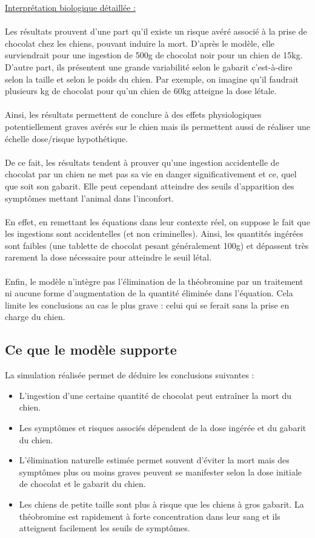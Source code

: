 \documentclass[11pt,a4paper]{article}
\begin{document}
\underline{Interprétation biologique détaillée :} 
\\
\\ Les résultats prouvent d'une part qu'il existe un risque avéré associé à la prise de 
chocolat chez les chiens, pouvant induire la mort. D'après le modèle, elle surviendrait 
pour une ingestion de 500g de chocolat noir pour un chien de 15kg. D'autre part, ils présentent une 
grande variabilité selon le gabarit c'est-à-dire selon la taille et selon le poids du chien. 
Par exemple, on imagine qu'il faudrait plusieurs kg de chocolat pour qu'un chien de 60kg atteigne la dose létale. \\
\\
Ainsi, les résultats permettent de conclure à des effets physiologiques
potentiellement graves avérés sur le chien mais ils permettent aussi de réaliser une 
échelle dose/risque hypothétique. \\
\\
De ce fait, les résultats tendent à prouver qu'une 
ingestion accidentelle de chocolat par un chien ne met pas sa vie en danger 
significativement et ce, quel que soit son gabarit. Elle peut cependant atteindre des seuils 
d'apparition des symptômes mettant l'animal dans l'inconfort. \\
\\
En effet, en remettant les 
équations dans leur contexte réel, on suppose le fait que les ingestions sont accidentelles 
(et non criminelles). Ainsi, les quantités ingérées sont faibles (une tablette de chocolat 
pesant généralement 100g) et dépassent très rarement la dose nécessaire pour atteindre le 
seuil létal. \\
\\
Enfin, le 
modèle n'intègre pas l'élimination de la théobromine par un traitement ni aucune forme 
d'augmentation de la quantité éliminée dans l'équation. Cela limite les conclusions au cas 
le plus grave : celui qui se ferait sans la prise en charge du chien. 


\subsection{Ce que le modèle supporte}

La simulation réalisée permet de déduire les conclusions suivantes :

\begin{itemize}
    \item {L'ingestion d'une certaine quantité de chocolat peut entraîner la mort du chien.}
    \item {Les symptômes et risques associés dépendent de la dose ingérée et du gabarit du chien.}
    \item {L'élimination naturelle estimée permet souvent d'éviter la mort mais des 
    symptômes plus ou moins graves peuvent se manifester selon la dose initiale de chocolat 
    et le gabarit du chien.}
    \item {Les chiens de petite taille sont plus à risque que les chiens à gros gabarit. La 
    théobromine est rapidement à forte concentration dans leur sang et ils atteignent 
    facilement les seuils de symptômes.}
\end{itemize}
\end{document}
